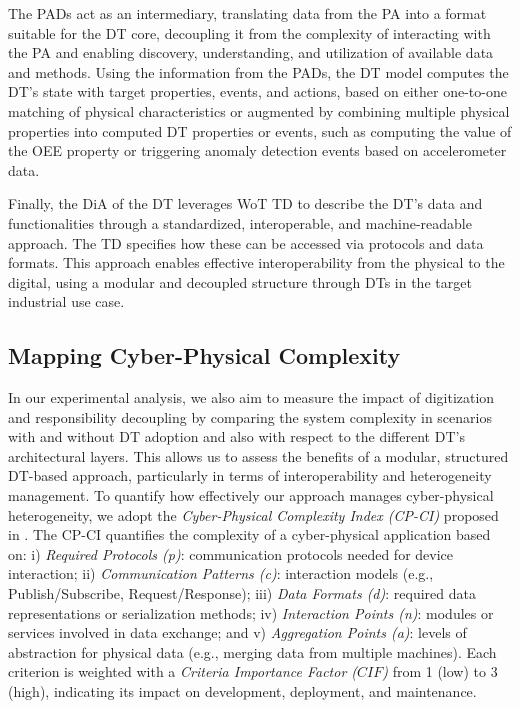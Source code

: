 The \acp{PAD} act as an intermediary, translating data from the \ac{PA} into a format suitable for the DT core, decoupling it from the complexity of interacting with the \ac{PA} and enabling discovery, understanding, and utilization of available data and methods.
Using the information from the \acp{PAD}, the \ac{DT} model computes the \ac{DT}'s state with target properties, events, and actions, based on either one-to-one matching of physical characteristics or augmented by combining multiple physical properties into computed \ac{DT} properties or events, such as computing the value of the \ac{OEE} property or triggering anomaly detection events based on accelerometer data. 

Finally, the \ac{DiA} of the \ac{DT} leverages \ac{WoT} \ac{TD} to describe the DT's data and functionalities through a standardized, interoperable, and machine-readable approach.
The \ac{TD} specifies how these can be accessed via protocols and data formats.
This approach enables effective interoperability from the physical to the digital, using a modular and decoupled structure through \acp{DT} in the target industrial use case.

\subsection{Mapping Cyber-Physical Complexity}
\label{sec:mappint_cp_complexity}

In our experimental analysis, we also aim to measure the impact of digitization and responsibility decoupling by comparing the system complexity in scenarios with and without \ac{DT} adoption and also with respect to the different \ac{DT}'s architectural layers.
This allows us to assess the benefits of a modular, structured DT-based approach, particularly in terms of interoperability and heterogeneity management.
To quantify how effectively our approach manages cyber-physical heterogeneity, we adopt the \textit{Cyber-Physical Complexity Index (CP-CI)} proposed in \cite{lippi_dt_causality_learning, LOMBARDO2024107203}.
The CP-CI quantifies the complexity of a cyber-physical application based on:
i) \textit{Required Protocols (p)}: communication protocols needed for device interaction;
ii) \textit{Communication Patterns (c)}: interaction models (e.g., Publish/Subscribe, Request/Response);
iii) \textit{Data Formats (d)}: required data representations or serialization methods;
iv) \textit{Interaction Points (n)}: modules or services involved in data exchange; and
v) \textit{Aggregation Points (a)}: levels of abstraction for physical data (e.g., merging data from multiple machines).
Each criterion is weighted with a \textit{Criteria Importance Factor ($CIF$)} from 1 (low) to 3 (high), indicating its impact on development, deployment, and maintenance.


